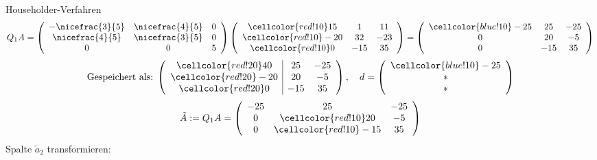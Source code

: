 \begin{example}{Householder-Verfahren}
    \[ 
        Q_1 A =
        \left(
        \begin{array}{ccc}
                -\nicefrac{3}{5} & \nicefrac{4}{5} & 0 \\ 
                \nicefrac{4}{5}  & \nicefrac{3}{5} & 0 \\ 
                0                & 0               & 5
            \end{array}
        \right)
        \left(
        \begin{array}{cccc}
                \cellcolor{red!10} 15  & 1   & 11  \\ 
                \cellcolor{red!10} -20 & 32  & -23 \\ 
                \cellcolor{red!10} 0   & -15 & 35
            \end{array}
        \right)
        = 
        \left(
        \begin{array}{cccc}
                \cellcolor{blue!10} -25 & 25  & -25 \\ 
                0                       & 20  & -5  \\ 
                0                       & -15 & 35
            \end{array}
        \right)
    \]
    \[ 
        \text{Gespeichert als:} \; \left(
        \begin{array}{ccc}
                \multicolumn{1}{c|}{\cellcolor{red!20} 40}  & 25  & -25 \\ 
                \multicolumn{1}{c|}{\cellcolor{red!20} -20} & 20  & -5  \\ 
                \multicolumn{1}{c|}{\cellcolor{red!20} 0}   & -15 & 35
            \end{array}
        \right), \quad d = \left(
        \begin{array}{c}
                \cellcolor{blue!10} -25 \\ 
                *                       \\ 
                *
            \end{array}
        \right)
    \]
    \[ 
        \tilde{A} := Q_1 A = 
        \left(
        \begin{array}{cccc}
                -25 & 25                     & -25 \\ 
                0   & \cellcolor{red!10} 20  & -5  \\ 
                0   & \cellcolor{red!10} -15 & 35
            \end{array}
        \right)
    \]
    Spalte $\tilde{a}_2$ transformieren:

\end{example}
